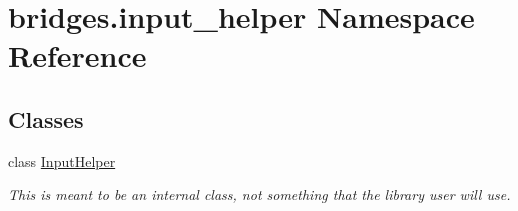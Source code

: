 \hypertarget{namespacebridges_1_1input__helper}{}\section{bridges.\+input\+\_\+helper Namespace Reference}
\label{namespacebridges_1_1input__helper}
\subsection*{Classes}
\begin{DoxyCompactItemize}
\item 
class \hyperlink{classbridges_1_1input__helper_1_1_input_helper}{Input\+Helper}
\begin{DoxyCompactList}\small\item\em This is meant to be an internal class, not something that the library user will use. \end{DoxyCompactList}\end{DoxyCompactItemize}
